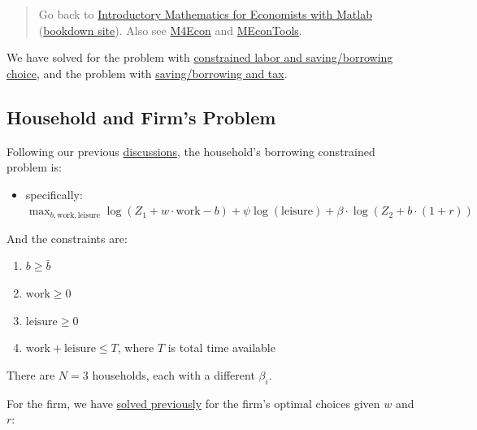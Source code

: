 \documentclass[
]{book}
\providecommand{\tightlist}{%
  \setlength{\itemsep}{0pt}\setlength{\parskip}{0pt}}
\begin{document}
\begin{quote}
Go back to \href{https://math4econ.github.io/}{Introductory Mathematics for Economists with Matlab} (\href{https://math4econ.github.io/bookdown}{bookdown site}). Also see \href{http://fanwangecon.github.io/M4Econ}{M4Econ} and \href{https://fanwangecon.github.io/MEconTools/}{MEconTools}.
\end{quote}

We have solved for the problem with \href{https://math4econ.github.io/optimization_application/household_asset_labor_constrained.html}{constrained labor and
saving/borrowing
choice},
and the problem with \href{https://math4econ.github.io/equilibrium/equilibrium_constrainedborrow.html}{saving/borrowing and
tax}.

\hypertarget{household-and-firms-problem}{%
\subsection{Household and Firm's Problem}\label{household-and-firms-problem}}

Following our previous
\href{https://math4econ.github.io/optimization_application/household_asset_labor_constrained.html}{discussions},
the household's borrowing constrained problem is:

\begin{itemize}
\tightlist
\item
  specifically:
  \(\max_{b,\textrm{work},\textrm{leisure}} \log (Z_1 +w\cdot \textrm{work}-b)+\psi \log (\textrm{leisure})+\beta \cdot \log (Z_2 +b\cdot (1+r))\)
\end{itemize}

And the constraints are:

\begin{enumerate}
\def\labelenumi{\arabic{enumi}.}
\item
  \(\displaystyle b\ge \bar{b}\)
\item
  \(\displaystyle \textrm{work}\ge 0\)
\item
  \(\displaystyle \textrm{leisure}\ge 0\)
\item
  \(\textrm{work}+\textrm{leisure}\le T\), where \(T\) is total time
  available
\end{enumerate}

There are \(N=3\) households, each with a different \(\beta_i\).

For the firm, we have \href{https://math4econ.github.io/matrix_application/KL_borrowhire_firm.html}{solved
previously}
for the firm's optimal choices given \(w\) and \(r\):
\end{document}
